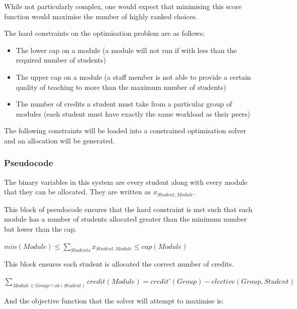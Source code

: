 While not particularly complex, one would expect that minimising this score
function would maximise the number of highly ranked choices.

The hard constraints on the optimisation problem are as follows:

\begin{itemize}
  \item The lower cap on a module (a module will not run if with less than the
        required number of students)
  \item The upper cap on a module (a staff member is not able to provide a
        certain quality of teaching to more than the maximum number of
        students)
  \item The number of credits a student must take from a particular group of
        modules (each student must have exactly the same workload as their
        peers)
\end{itemize}

The following constraints will be loaded into a constrained optimisation
solver and an allocation will be generated.

\subsubsection{Pseudocode}

The binary variables in this system are every student along with every module
that they can be allocated. They are written as $x_{Student,Module}$.

This block of pseudocode ensures that the hard constraint is met such that
each module has a number of students allocated greater than the minimum number
but lower than the cap.

\begin{algorithmic}
  \STATE $min(Module) \leq \displaystyle\sum_{Students}x_{Student,Module} \leq cap(Module)$
\ENDFOR
\end{algorithmic}

This block ensures each student is allocated the correct number of credits.

\begin{algorithmic}
    \STATE $\displaystyle\sum_{Module \in Group \cap ok(Student)} credit(Module) = credit'(Group) - elective(Group,Student)$
  \ENDFOR
\ENDFOR
\end{algorithmic}

And the objective function that the solver will attempt to maximise is:

